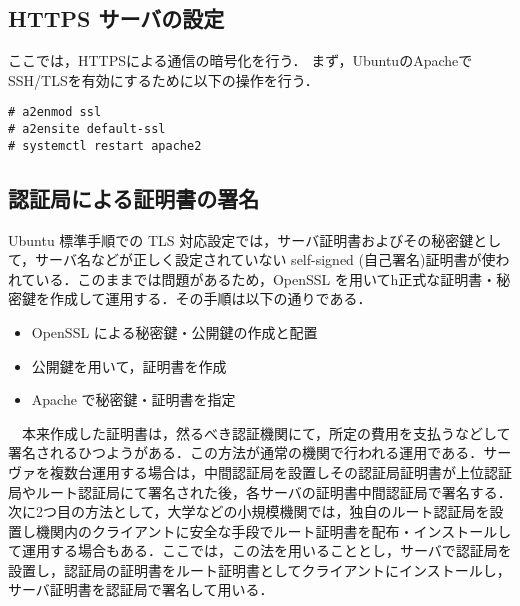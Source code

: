 \documentclass[a4j,titlepage]{jarticle}
\begin{document}
%
\subsection{HTTPS サーバの設定}
ここでは，HTTPSによる通信の暗号化を行う．
まず，UbuntuのApacheでSSH/TLSを有効にするために以下の操作を行う．
\begin{center}
\begin{screen}
\begin{verbatim}
# a2enmod ssl
# a2ensite default-ssl
# systemctl restart apache2
\end{verbatim}
\end{screen}
\end{center}

%
\subsection{認証局による証明書の署名}
Ubuntu 標準手順での TLS 対応設定では，サーバ証明書およびその秘密鍵として，サーバ名などが正しく設定されていない self-signed (自己署名)証明書が使われている．このままでは問題があるため，OpenSSL を用いてh正式な証明書・秘密鍵を作成して運用する．その手順は以下の通りである．\\
\begin{itemize}
\item OpenSSL による秘密鍵・公開鍵の作成と配置

\item 公開鍵を用いて，証明書を作成

\item Apache で秘密鍵・証明書を指定
\end{itemize}

　本来作成した証明書は，然るべき認証機関にて，所定の費用を支払うなどして署名されるひつようがある．この方法が通常の機関で行われる運用である．サーヴァを複数台運用する場合は，中間認証局を設置しその認証局証明書が上位認証局やルート認証局にて署名された後，各サーバの証明書中間認証局で署名する．次に2つ目の方法として，大学などの小規模機関では，独自のルート認証局を設置し機関内のクライアントに安全な手段でルート証明書を配布・インストールして運用する場合もある．ここでは，この法を用いることとし，サーバで認証局を設置し，認証局の証明書をルート証明書としてクライアントにインストールし，サーバ証明書を認証局で署名して用いる．\\

%
\end{document}
